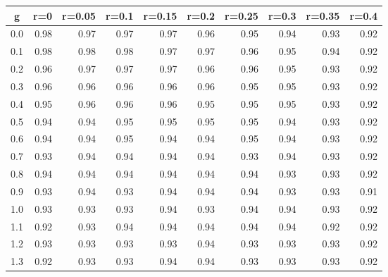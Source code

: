 %
\begin{table}[!tbp]
 \begin{center}
 \begin{tabular}{rrrrrrrrrr}\hline\hline
\multicolumn{1}{c}{g}&\multicolumn{1}{c}{r=0}&\multicolumn{1}{c}{r=0.05}&\multicolumn{1}{c}{r=0.1}&\multicolumn{1}{c}{r=0.15}&\multicolumn{1}{c}{r=0.2}&\multicolumn{1}{c}{r=0.25}&\multicolumn{1}{c}{r=0.3}&\multicolumn{1}{c}{r=0.35}&\multicolumn{1}{c}{r=0.4}\tabularnewline
\hline
0.0&0.98&0.97&0.97&0.97&0.96&0.95&0.94&0.93&0.92\tabularnewline
0.1&0.98&0.98&0.98&0.97&0.97&0.96&0.95&0.94&0.92\tabularnewline
0.2&0.96&0.97&0.97&0.97&0.96&0.96&0.95&0.93&0.92\tabularnewline
0.3&0.96&0.96&0.96&0.96&0.96&0.95&0.95&0.93&0.92\tabularnewline
0.4&0.95&0.96&0.96&0.96&0.95&0.95&0.95&0.93&0.92\tabularnewline
0.5&0.94&0.94&0.95&0.95&0.95&0.95&0.94&0.93&0.92\tabularnewline
0.6&0.94&0.94&0.95&0.94&0.94&0.95&0.94&0.93&0.92\tabularnewline
0.7&0.93&0.94&0.94&0.94&0.94&0.93&0.94&0.93&0.92\tabularnewline
0.8&0.94&0.94&0.94&0.94&0.94&0.94&0.93&0.93&0.92\tabularnewline
0.9&0.93&0.94&0.93&0.94&0.94&0.94&0.93&0.93&0.91\tabularnewline
1.0&0.93&0.93&0.93&0.94&0.93&0.94&0.94&0.93&0.92\tabularnewline
1.1&0.92&0.93&0.94&0.94&0.94&0.94&0.94&0.92&0.92\tabularnewline
1.2&0.93&0.93&0.93&0.93&0.94&0.93&0.93&0.93&0.92\tabularnewline
1.3&0.92&0.93&0.93&0.94&0.94&0.93&0.93&0.93&0.92\tabularnewline
\hline
\end{tabular}

\end{center}

\end{table}

